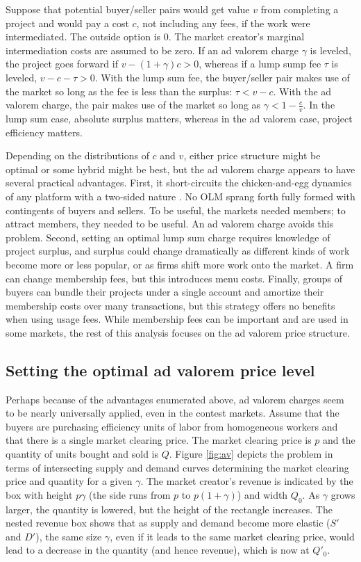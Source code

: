 \documentclass{llncs}
\begin{document}
Suppose that potential buyer/seller pairs would get value $v$ from
completing a project and would pay a cost $c$, not including any fees,
if the work were intermediated. The outside option is $0$. The market
creator's marginal intermediation costs are assumed to be zero. If an
ad valorem charge $\gamma$ is leveled, the project goes forward if $v
- (1 + \gamma)c > 0$, whereas if a lump sump fee $\tau$ is leveled, $v
- c - \tau > 0$. With the lump sum fee, the buyer/seller pair makes
use of the market so long as the fee is less than the surplus: $\tau <
v - c$. With the ad valorem charge, the pair makes use of the market so
long as $\gamma < 1 - \frac{c}{v}$. In the lump sum case, absolute
surplus matters, whereas in the ad valorem case, project efficiency
matters.

Depending on the distributions of $c$ and $v$, either price structure
might be optimal or some hybrid might be best, but the ad valorem
charge appears to have several practical advantages. First, it
short-circuits the chicken-and-egg dynamics of any platform with a
two-sided nature \cite{caillaud2003chicken}.  No OLM sprang forth
fully formed with contingents of buyers and sellers. To be useful,
the markets needed members; to attract members, they needed to be
useful. An ad valorem charge avoids this problem. Second, setting an
optimal lump sum charge requires knowledge of project surplus, and
surplus could change dramatically as different kinds of work become
more or less popular, or as firms shift more work onto the market. A
firm can change membership fees, but this introduces menu
costs. Finally, groups of buyers can bundle their projects under a
single account and amortize their membership costs over many
transactions, but this strategy offers no benefits when using usage fees.
While membership fees can be important and are used in some markets,
the rest of this analysis focuses on the ad valorem price structure.

\subsection{Setting the optimal ad valorem price level}
Perhaps because of the advantages enumerated above, ad valorem charges
seem to be nearly universally applied, even in the contest
markets. Assume that the buyers are purchasing efficiency units of
labor from homogeneous workers and that there is a single market
clearing price. The market clearing price is $p$ and the quantity of
units bought and sold is $Q$. Figure \ref{fig:av} depicts the problem
in terms of intersecting supply and demand curves determining the
market clearing price and quantity for a given $\gamma$. The market
creator's revenue is indicated by the box with height $p\gamma$ (the
side runs from $p$ to $p(1+\gamma)$) and width $Q_0$. As $\gamma$
grows larger, the quantity is lowered, but the height of the rectangle
increases. The nested revenue box shows that as supply and demand
become more elastic ($S'$ and $D'$), the same size $\gamma$, even if
it leads to the same market clearing price, would lead to a decrease
in the quantity (and hence revenue), which is now at $Q'_0$.
\end{document}
